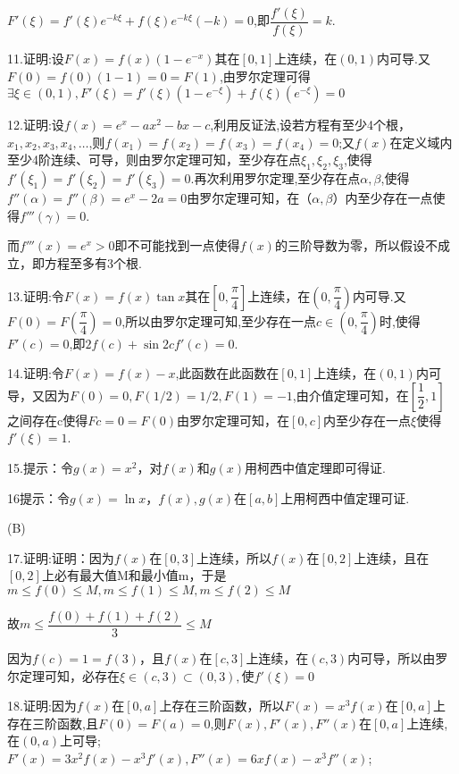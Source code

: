$F'(\xi ) = f'(\xi ){e^{ - k\xi }} + f(\xi ){e^{ - k\xi }}( - k) = 0$,即$\dfrac{{f'(\xi )}}{{f(\xi )}} = k$.

11.证明:设$F(x) = f(x)(1 - {e^{ - x}})$其在$[0,1]$上连续，在$(0,1)$内可导.又$F(0) = f(0)(1 - 1) = 0 = F(1)$,由罗尔定理可得$\exists \xi  \in (0,1),F'(\xi ) = f'(\xi )(1 - {e^{ - \xi }}) + f(\xi )({e^{ - \xi }}) = 0$

12.证明:设$f(x) = {e^x} - a{x^2} - bx - c$,利用反证法,设若方程有至少4个根，${x_1},{x_2},{x_3},{x_4}, \ldots $,则$f({x_1}) = f({x_2}) = f({x_3}) = f({x_4}) = 0$;又$f(x)$在定义域内至少4阶连续、可导，则由罗尔定理可知，至少存在点${\xi _1},{\xi _2},{\xi _3}$,使得$f'({\xi _1}) = f'({\xi _2}) = f'({\xi _3}) = 0$.再次利用罗尔定理,至少存在点$\alpha ,\beta $,使得$f''(\alpha ) = f''(\beta ) = {e^x} - 2a = 0$由罗尔定理可知，在（$\alpha ,\beta $）内至少存在一点使得$f'''(\gamma ) = 0$.

而$f'''(x) = {e^x} > 0$即不可能找到一点使得$f(x)$的三阶导数为零，所以假设不成立，即方程至多有3个根.

13.证明:令$F(x) = f(x)\tan x$其在$[0,{\dfrac{\pi }{4}}]$上连续，在$(0, {\dfrac{\pi }{4}})$内可导.又$F(0) = F(\dfrac{\pi }{4}) = 0$,所以由罗尔定理可知,至少存在一点$c \in \left( {0,\dfrac{\pi }{4}} \right)$时,使得$F'(c) = 0$,即$2f(c) + \sin 2cf'(c) = 0$.

14.证明:令$F(x) = f(x) - x$,此函数在此函数在$[0,1]$上连续，在$(0,1)$内可导，又因为$F(0) = 0,F(1/2) = 1/2,F(1) =  - 1$,由介值定理可知，在$[\dfrac{1}{2},1]$之间存在c使得$Fc = 0 = F\left( 0 \right)$由罗尔定理可知，在$[0,c]$内至少存在一点$\xi $使得$f'(\xi ) = 1$.

15.提示：令$g(x) = {x^2}$，对$f(x)$和$g(x)$用柯西中值定理即可得证.

16提示：令$g(x) = \ln x$，$f(x),g(x)$在$[a,b]$上用柯西中值定理可证.

(B)

17.证明:证明：因为$f(x)$在$[0,3]$上连续，所以$f(x)$在$[0,2]$上连续，且在$[0,2]$上必有最大值M和最小值m，于是$m \le f(0) \le M,m \le f(1) \le M,m \le f(2) \le M$

故$m \le \dfrac{{f(0) + f(1) + f(2)}}{3} \le M$

因为$f\left( c \right) = 1 = f\left( 3 \right)$，且$f(x)$在$[c,3]$上连续，在$(c,3)$内可导，所以由罗尔定理可知，必存在$\xi  \in (c,3) \subset (0,3),$使$f'(\xi ) = 0$

18.证明:因为$f(x)$在$[0,a]$上存在三阶函数，所以$F(x) = {x^3}f\left( x \right)$在$[0,a]$上存在三阶函数,且$F\left( 0 \right) = F\left( a \right) = 0$,则$F(x),F'(x),F''(x)$在$[0,a]$上连续,在$(0,a)$上可导;
$F'(x) = 3{x^2}f(x) - {x^3}f'(x),F''(x) = 6xf(x) - {x^3}f''(x)$;

